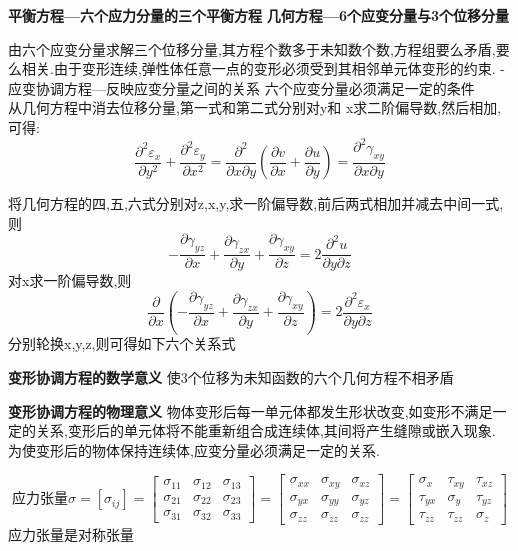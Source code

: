 \documentclass{book}
\begin{document}
\textbf{平衡方程—六个应力分量的三个平衡方程}
\textbf{几何方程—6个应变分量与3个位移分量}

由六个应变分量求解三个位移分量,其方程个数多于未知数个数,方程组要么矛盾,要么相关.由于变形连续,弹性体任意一点的变形必须受到其相邻单元体变形的约束.
-应变协调方程—反映应变分量之间的关系
六个应变分量必须满足一定的条件\\

从几何方程中消去位移分量,第一式和第二式分别对y和 x求二阶偏导数,然后相加,可得:
$$
\frac{\partial^2 \varepsilon_x }{\partial y^2} + \frac{\partial^2 \varepsilon_y }{\partial x^2} =
\frac{\partial^2}{\partial x \partial y}(\frac{\partial v}{\partial x}+\frac{\partial u}{\partial y})=
\frac{\partial^2 \gamma_{xy}}{\partial x\partial y}
$$

将几何方程的四,五,六式分别对z,x,y,求一阶偏导数,前后两式相加并减去中间一式,则
$$
- \frac{\partial \gamma_{yz}}{\partial x} +\frac{\partial \gamma_{zx}}{\partial y} +\frac{\partial \gamma_{xy}}{\partial z}
=2 \frac{\partial ^2 u}{\partial y \partial z}
$$
对x求一阶偏导数,则
$$
\frac{\partial}{\partial x}(- \frac{\partial \gamma_{yz}}{\partial x} +\frac{\partial \gamma_{zx}}{\partial y} +\frac{\partial \gamma_{xy}}{\partial z} )
= 2 \frac{\partial^2 \varepsilon_x}{\partial y\partial z}
$$
分别轮换x,y,z,则可得如下六个关系式

\textbf{变形协调方程的数学意义}
使3个位移为未知函数的六个几何方程不相矛盾

\textbf{变形协调方程的物理意义}
物体变形后每一单元体都发生形状改变,如变形不满足一定的关系,变形后的单元体将不能重新组合成连续体,其间将产生缝隙或嵌入现象.
为使变形后的物体保持连续体,应变分量必须满足一定的关系.

\begin{equation}
\text{应力张量}
\sigma=
[\sigma_{ij}]=
\left[
  \begin{array}{ccc}
  \sigma_{11} & \sigma_{12} & \sigma_{13} \\
  \sigma_{21} & \sigma_{22} & \sigma_{23} \\
  \sigma_{31} & \sigma_{32} & \sigma_{33}
  \end{array}
\right]
=
\left[
  \begin{array}{ccc}
  \sigma_{xx} & \sigma_{xy} & \sigma_{xz} \\
  \sigma_{yx} & \sigma_{yy} & \sigma_{yz} \\
  \sigma_{zz} & \sigma_{zz} & \sigma_{zz}
  \end{array}
\right]
=
\left[
  \begin{array}{ccc}
  \sigma_{x} & \tau_{xy} & \tau_{xz} \\
  \tau_{yx} & \sigma_{y} & \tau_{yz} \\
  \tau_{zz} & \tau_{zz} & \sigma_{z}
  \end{array}
\right]
\end{equation}
应力张量是对称张量
\end{document}
